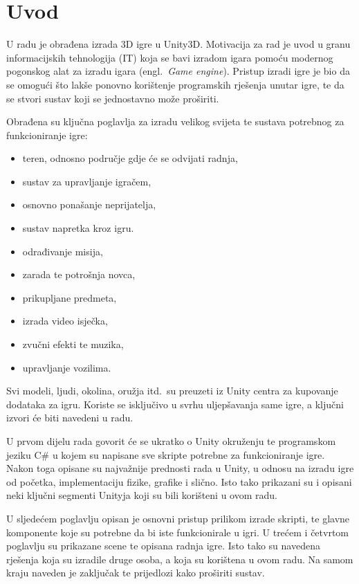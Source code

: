 \section{Uvod}
U radu je obrađena izrada 3D igre u Unity3D. Motivacija za rad je uvod u granu informacijskih tehnologija (IT) koja se bavi izradom igara pomoću modernog pogonskog alat za izradu igara (engl.~\textit{Game engine}). Pristup izradi igre je bio da se omogući što lakše ponovno korištenje programskih rješenja unutar igre, te da se stvori sustav koji se jednostavno može proširiti.

Obrađena su ključna poglavlja za izradu velikog svijeta te sustava potrebnog za funkcioniranje igre:
\begin{itemize}
 \item teren, odnosno područje gdje će se odvijati radnja,
 \item sustav za upravljanje igračem,
 \item osnovno ponašanje neprijatelja,
 \item sustav napretka kroz igru.
 \item odrađivanje misija,
 \item zarada te potrošnja novca,
 \item prikupljane predmeta,
 \item izrada video isječka,
 \item zvučni efekti te muzika,
 \item upravljanje vozilima.
\end{itemize}

Svi modeli, ljudi, okolina, oružja itd.~su preuzeti iz Unity centra za kupovanje dodataka za igru. Koriste se isključivo u svrhu uljepšavanja same igre, a ključni izvori će biti navedeni u radu. 

U prvom dijelu rada govorit će se ukratko o Unity okruženju te programskom jeziku C\# u kojem su napisane sve skripte potrebne za funkcioniranje igre. Nakon toga opisane su najvažnije prednosti rada u Unity, u odnosu na izradu igre od početka, implementaciju fizike, grafike i slično. Isto tako prikazani su i opisani neki ključni segmenti Unityja koji su bili korišteni u ovom radu. 

U sljedećem poglavlju opisan je osnovni pristup prilikom izrade skripti, te glavne komponente koje su potrebne da bi iste funkcionirale u igri. U trećem i četvrtom poglavlju su prikazane scene te opisana radnja igre. Isto tako su navedena rješenja koja su izradile druge osoba, a koja su korištena u ovom radu.
Na samom kraju naveden je zaključak te prijedlozi kako proširiti sustav.

